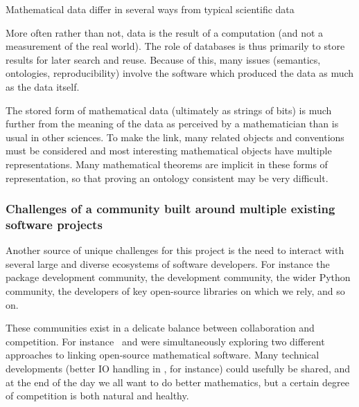 \begin{compactitem}
\item Mathematical data differ in several ways from typical
  scientific data
  \begin{compactitem}
  \item More often rather than not, data is the result of a computation (and
    not a measurement of the real world). The role of databases is thus primarily
    to store results for later search and reuse. 
    Because of this, many issues (semantics, ontologies,
    reproducibility) involve the software which produced the data as
    much as the data itself.
  \item The stored form of mathematical data (ultimately as strings of
    bits) is much further from the meaning of the data as perceived
    by a mathematician than is usual in other sciences. To make the
    link, many related objects and conventions must be considered and
    most interesting mathematical objects have multiple
    representations. Many mathematical theorems are implicit in these
    forms of representation, so that proving an ontology consistent
    may be very difficult.
  \end{compactitem}
\end{compactitem}

\subsubsection{Challenges of a community built around multiple
  existing software projects}

Another source of unique challenges for this project is the need to
interact with several large and diverse ecosystems of software
developers. For instance the \GAP package development community, the
\Sage development community, the wider Python community, the developers
of key open-source libraries on which we rely, and so on.

These communities exist in a delicate balance between collaboration
and competition. For instance \scienceproject\ and \Sage were
simultaneously exploring two different approaches to linking
open-source mathematical software. Many technical developments (better
IO handling in \GAP, for instance) could usefully be shared, and at
the end of the day we all want to do better mathematics, but a certain
degree of competition is both natural and healthy.


